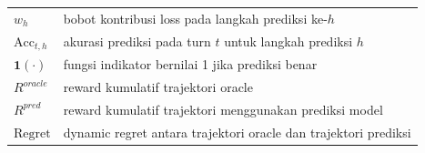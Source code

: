 \begin{table}[h]
\begin{tabular}{ll}
$w_h$ & bobot kontribusi loss pada langkah prediksi ke-$h$ \\

$\text{Acc}_{t,h}$ & akurasi prediksi pada turn $t$ untuk langkah prediksi $h$ \\

$\mathbf{1}(\cdot)$ & fungsi indikator bernilai 1 jika prediksi benar \\

$R^{oracle}$ & reward kumulatif trajektori oracle \\

$R^{pred}$ & reward kumulatif trajektori menggunakan prediksi model \\

$\text{Regret}$ & dynamic regret antara trajektori oracle dan trajektori prediksi \\

\hline
\end{tabular}
\end{table}
